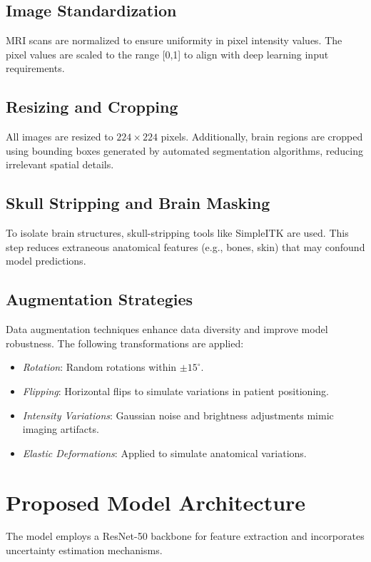 \documentclass[12pt,twocolumn]{report}
\begin{document}
\subsection{Image Standardization}
MRI scans are normalized to ensure uniformity in pixel intensity values. The pixel values are scaled to the range [0,1] to align with deep learning input requirements.

\subsection{Resizing and Cropping}
All images are resized to $224 \times 224$ pixels. Additionally, brain regions are cropped using bounding boxes generated by automated segmentation algorithms, reducing irrelevant spatial details.

\subsection{Skull Stripping and Brain Masking}
To isolate brain structures, skull-stripping tools like SimpleITK are used. This step reduces extraneous anatomical features (e.g., bones, skin) that may confound model predictions.

\subsection{Augmentation Strategies}
Data augmentation techniques enhance data diversity and improve model robustness. The following transformations are applied:
\begin{itemize}
    \item \textit{Rotation}: Random rotations within $\pm15^\circ$.
    \item \textit{Flipping}: Horizontal flips to simulate variations in patient positioning.
    \item \textit{Intensity Variations}: Gaussian noise and brightness adjustments mimic imaging artifacts.
    \item \textit{Elastic Deformations}: Applied to simulate anatomical variations.
\end{itemize}

\section{Proposed Model Architecture}

The model employs a ResNet-50 backbone for feature extraction and incorporates uncertainty estimation mechanisms.
\end{document}
